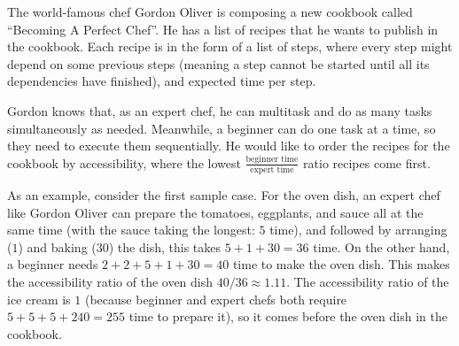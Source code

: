 

\newcommand{\maxn}{500}
\newcommand{\maxr}{10}
\newcommand{\maxs}{50}
\newcommand{\maxt}{10^6}
\newcommand{\maxd}{49}

The world-famous chef Gordon Oliver is composing a new cookbook called ``Becoming A Perfect Chef''.
He has a list of recipes that he wants to publish in the cookbook.
Each recipe is in the form of a list of steps, where every step might depend on some previous steps
(meaning a step cannot be started until all its dependencies have finished),
and expected time per step.

Gordon knows that, as an expert chef, he can multitask and do as many tasks simultaneously as needed.
Meanwhile, a beginner can do one task at a time, so they need to execute them sequentially.
He would like to order the recipes for the cookbook by accessibility,
where the lowest $\frac{\text{beginner time}}{\text{expert time}}$ ratio recipes come first.

As an example, consider the first sample case.
For the oven dish, an expert chef like Gordon Oliver
can prepare the tomatoes, eggplants, and sauce all at the same time
(with the sauce taking the longest: $5$ time),
and followed by arranging ($1$) and baking ($30$) the dish, this takes $5+1+30=36$ time.
On the other hand, a beginner needs $2+2+5+1+30=40$ time to make the oven dish.
This makes the accessibility ratio of the oven dish $40/36\approx 1.11$.
The accessibility ratio of the ice cream is $1$
(because beginner and expert chefs both require $5+5+5+240=255$ time to prepare it),
so it comes before the oven dish in the cookbook.

